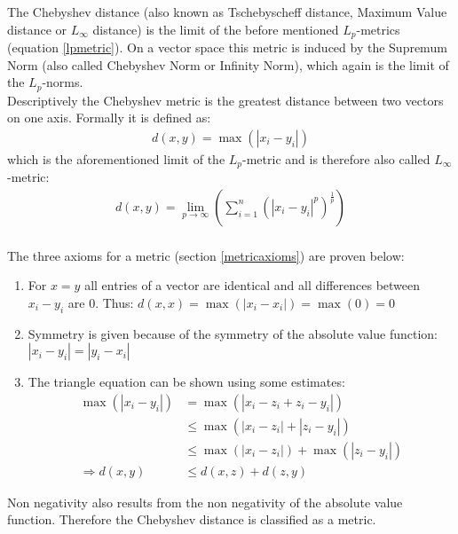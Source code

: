 \marginnote{\textcolor{cyan}{Niklas Conen}}
The Chebyshev distance (also known as Tschebyscheff distance, Maximum Value distance or $L_\infty$ distance) is the limit of the before mentioned $L_p$-metrics (equation \ref{lpmetric}). On a vector space this metric is induced by the Supremum Norm (also called Chebyshev Norm or Infinity Norm), which again is the limit of the $L_p$-norms.\\
Descriptively the Chebyshev metric is the greatest distance between two vectors on one axis. Formally it is defined as:
%
\begin{align}
    d(x, y) = \max (| x_i - y_i |)
\end{align}
%
which is the aforementioned limit of the $L_p$-metric and is therefore also called $L_\infty$-metric:
\begin{align}
    d(x, y) = \lim \limits_{p \to \infty} \left( \sum_{i=1}^{n}(|x_i-y_i|^p)^\frac{1}{p} \right)
\end{align}
\ \\
The three axioms for a metric (section \ref{metricaxioms}) are proven below:
\begin{enumerate}
    \item For $x = y$ all entries of a vector are identical and all differences between $x_i - y_i$ are $0$. Thus: $d(x,x) = \max (|x_i - x_i|) = \max (0) = 0$
    \item Symmetry is given because of the symmetry of the absolute value function: 
          $| x_i - y_i | = | y_i - x_i |$
    \item The triangle equation can be shown using some estimates:
    \begin{align*}
        \max(| x_i - y_i |) &= \max(|x_i - z_i + z_i - y_i|)\\
         &\leq \max(|x_i - z_i|+ |z_i - y_i|) \\
         &\leq \max(| x_i - z_i |) + \max(|z_i - y_i|)\\
        \Rightarrow d(x,y) &\leq d(x, z) + d(z, y)
    \end{align*}
\end{enumerate}
Non negativity also results from the non negativity of the absolute value function. Therefore the Chebyshev distance is classified as a metric.
